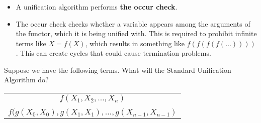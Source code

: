 \begin{frame}
	\frametitle{\insertsection}
	\begin{itemize}
		\item A unification algorithm performs \textbf{the occur check}.
		\item The occur check checks whether a variable appears among the arguments of the functor, which it is being unified with. This is required to prohibit infinite terms like \(X = f(X)\), which results in something like \(f(f(f(f(\ldots)))) \). This can create cycles that could cause termination problems.
	\end{itemize}

	Suppose we have the following terms. What will the Standard Unification Algorithm do?
	
	\begin{table}
		\centering
		\begin{tabular}{c}
			\(f(X_1, X_2, \ldots, X_n) \) \\
			\\
			\(f(g(X_0, X_0), g(X_1, X_1), \ldots, g(X_{n-1}, X_{n-1}) \)
		\end{tabular}
	\end{table}
\end{frame}

